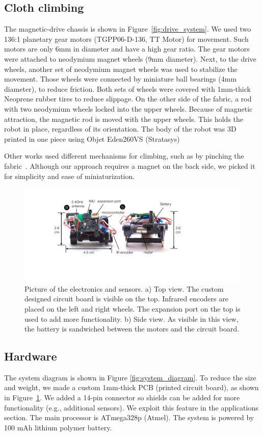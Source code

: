 \subsection{Cloth climbing}
The magnetic-drive chassis is shown in Figure~\ref{fig:drive_system}. We used two 136:1 planetary gear motors (TGPP06-D-136, TT Motor) for movement. Such motors are only 6mm in diameter and have a high gear ratio. The gear motors were attached to neodymium magnet wheels (9mm diameter). Next, to the drive wheels, another set of neodymium magnet wheels was used to stabilize the movement. Those wheels were connected by miniature ball bearings (4mm diameter), to reduce friction. Both sets of wheels were covered with 1mm-thick Neoprene rubber tires to reduce slippage. On the other side of the fabric, a rod with two neodymium wheels locked into the upper wheels. Because of magnetic attraction, the magnetic rod is moved with the upper wheels. This holds the robot in place, regardless of its orientation. The body of the robot was 3D printed in one piece using Objet Eden260VS (Stratasys) 

Other works used different mechanisms for climbing, such as by pinching the fabric~\cite{liu2012system}. Although our approach requires a magnet on the back side, we picked it for simplicity and ease of miniaturization.  

\begin{figure}[!h]
\centering
\includegraphics[width=0.8\columnwidth]{pictures/chapter4/top_side_view.pdf}
\caption{Picture of the electronics and sensors. a) Top view. The custom designed circuit board is visible on the top. Infrared encoders are placed on the left and right wheels. The expansion port on the top is used to add more functionality. b) Side view. As visible in this view, the battery is sandwiched between the motors and the circuit board. }
\label{fig:top_side_view}
\end{figure}

\subsection{Hardware}
The system diagram is shown in Figure \ref{fig:system_diagram}. To reduce the size and weight, we made a custom 1mm-thick PCB (printed circuit board), as shown in Figure~\ref{fig:top_side_view}. We added a 14-pin connector so shields can be added for more functionality (e.g., additional sensors). We exploit this feature in the applications section. The main processor is ATmega328p (Atmel). The system is powered by 100 mAh lithium polymer battery. 

